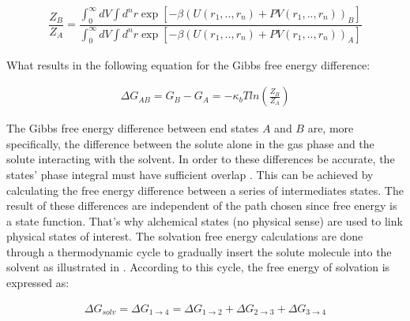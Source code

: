\begin{equation}
\label{eq:partiso}
\begin{aligned}
\dfrac{Z_{B}}{Z_{A}} = \dfrac{\int_{0}^{\infty} dV \int d^{n}r \exp \left[ -\beta \left(U(r_{1},..,r_{n}) + PV(r_{1},..,r_{n}) \right)_{B} \right]}{\int_{0}^{\infty} dV \int d^{n}r \exp \left[ -\beta \left(U(r_{1},..,r_{n}) + PV(r_{1},..,r_{n}) \right)_{A} \right]}
\end{aligned}
\end{equation}

What results in the following equation for the Gibbs free energy difference:

\begin{equation}
\label{eq:dif}
\begin{aligned}
\Delta G_{AB} = G_{B} - G_{A}= -\kappa_{b}T ln \left( \frac{Z_{B}}{Z_{A}}\right)
\end{aligned}
\end{equation}

The Gibbs free energy difference between end states $A$ and $B$ are, more specifically, the difference between the solute alone in the gas phase and the solute interacting with the solvent. In order to these differences be accurate, the states' phase integral must have sufficient overlap  \cite{klimovich}. This can be achieved by calculating the free energy difference between a series of intermediates states. The result of these differences are independent of the path chosen since free energy is a state function. That's why alchemical states (no physical sense) are used to link physical states of interest. The solvation free energy calculations are done through a thermodynamic cycle to gradually insert the solute molecule into the solvent as illustrated in . According to this cycle, the free energy of solvation is expressed as:

\begin{equation}
\label{eq:freesolv}
\begin{aligned}
\Delta G_{solv} = \Delta G_{1 \rightarrow 4} = \Delta G_{1 \rightarrow 2} + \Delta G_{2 \rightarrow 3} + \Delta G_{3 \rightarrow 4}  
\end{aligned}
\end{equation}

